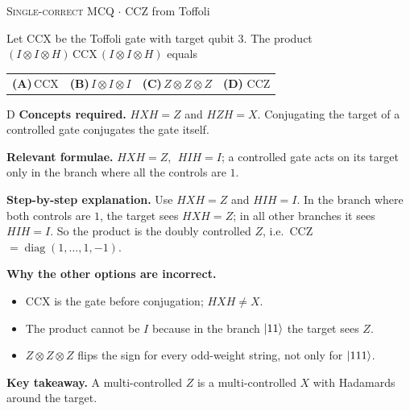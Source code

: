 \documentclass[11pt,a4paper]{article}
\newcommand{\optlabel}[1]{\textbf{(#1)}}
\newcommand{\correctlabel}[1]{\textcolor{okgreen}{\textbf{(#1)}\,\ding{51}}}
\newenvironment{qitem}[1]{\begin{list}{}{\setlength{\leftmargin}{3.3em}\setlength{\labelwidth}{3.1em}%
  \setlength{\labelsep}{0.2em}\setlength{\topsep}{3pt}\setlength{\parsep}{3pt}}\item[\textbf{Q.#1}\hfill]}{\end{list}}
\newcommand{\qsep}{\par\vspace{2pt}{\color{black!15}\hrule}\vspace{4pt}}
\newcommand{\qmeta}[2]{{\footnotesize\color{black!60}\textsc{#1} \;$\cdot$\; #2}\par}
\begin{document}
\begin{qitem}{27}
\qmeta{Single-correct MCQ}{CCZ from Toffoli}
Let CCX be the Toffoli gate with target qubit 3. The product $(I \otimes I \otimes H)\,\mathrm{CCX}\,(I \otimes I \otimes H)$ equals
\par\smallskip\noindent\begin{tabularx}{\linewidth}{@{}*{4}{L}@{}}
\optlabel{A}\,CCX & \optlabel{B}\,$I \otimes I \otimes I$ & \optlabel{C}\,$Z \otimes Z \otimes Z$ & \correctlabel{D}\,CCZ
\end{tabularx}
\end{qitem}
\begin{solbox}{D}
\textbf{\color{brand}Concepts required.} $HXH = Z$ and $HZH = X$. Conjugating the target of a controlled gate conjugates the gate itself.

\textbf{\color{brand}Relevant formulae.} $HXH = Z$, $\;HIH = I$; a controlled gate acts on its target only in the branch where all the controls are $1$.

\textbf{\color{brand}Step-by-step explanation.} Use $HXH = Z$ and $HIH = I$. In the branch where both controls are $1$, the target sees $HXH = Z$; in all other branches it sees $HIH = I$. So the product is
the doubly controlled $Z$, i.e.\ CCZ $= \operatorname{diag}(1, \dots, 1, -1)$.

\textbf{\color{brand}Why the other options are incorrect.}
\begin{itemize}[leftmargin=2.4em, itemsep=1pt, topsep=2pt]
\item[\textbf{(A)}] CCX is the gate before conjugation; $HXH \ne X$.
\item[\textbf{(B)}] The product cannot be $I$ because in the branch $\ket{11}$ the target sees $Z$.
\item[\textbf{(C)}] $Z \otimes Z \otimes Z$ flips the sign for every odd-weight string, not only for $\ket{111}$.
\end{itemize}
\textbf{\color{brand}Key takeaway.} A multi-controlled $Z$ is a multi-controlled $X$ with Hadamards around the target.
\end{solbox}
\qsep
\end{document}

